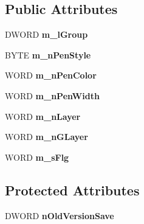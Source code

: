 \subsection*{Public Attributes}
\begin{DoxyCompactItemize}
\item 
\hypertarget{classCData_a7bebed385410a042f6160779e1a42694}{D\-W\-O\-R\-D {\bfseries m\-\_\-l\-Group}}\label{classCData_a7bebed385410a042f6160779e1a42694}

\item 
\hypertarget{classCData_adc00b873b1f0eb4a6e88a7d380416da4}{B\-Y\-T\-E {\bfseries m\-\_\-n\-Pen\-Style}}\label{classCData_adc00b873b1f0eb4a6e88a7d380416da4}

\item 
\hypertarget{classCData_a6ed5e76e74b645ceb3166d6fa6ae0002}{W\-O\-R\-D {\bfseries m\-\_\-n\-Pen\-Color}}\label{classCData_a6ed5e76e74b645ceb3166d6fa6ae0002}

\item 
\hypertarget{classCData_ab88459c3c65c638621dc3bfb431a6e8b}{W\-O\-R\-D {\bfseries m\-\_\-n\-Pen\-Width}}\label{classCData_ab88459c3c65c638621dc3bfb431a6e8b}

\item 
\hypertarget{classCData_a95d53f070f6464f221c31c84d0eaa5a8}{W\-O\-R\-D {\bfseries m\-\_\-n\-Layer}}\label{classCData_a95d53f070f6464f221c31c84d0eaa5a8}

\item 
\hypertarget{classCData_a6cfb0f5845c1b5228300eadab77ca9b6}{W\-O\-R\-D {\bfseries m\-\_\-n\-G\-Layer}}\label{classCData_a6cfb0f5845c1b5228300eadab77ca9b6}

\item 
\hypertarget{classCData_a9224a0f91e8e408e47669ed6318c2869}{W\-O\-R\-D {\bfseries m\-\_\-s\-Flg}}\label{classCData_a9224a0f91e8e408e47669ed6318c2869}

\end{DoxyCompactItemize}
\subsection*{Protected Attributes}
\begin{DoxyCompactItemize}
\item 
\hypertarget{classCData_ab43dba9a604736fa7bc596aef5171d87}{D\-W\-O\-R\-D {\bfseries n\-Old\-Version\-Save}}\label{classCData_ab43dba9a604736fa7bc596aef5171d87}

\end{DoxyCompactItemize}
